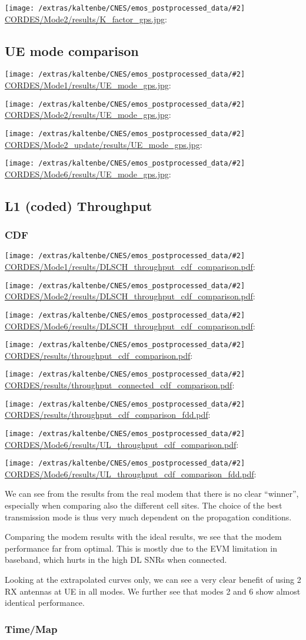\documentclass[a4paper,10pt]{article}
\newcommand{\printfile}[2][]{
 \begin{minipage}{8cm}
  \centering
  \texttt{[image: /extras/kaltenbe/CNES/emos\_postprocessed\_data/\#2]}
  \url{#2}: #1

 \end{minipage}
}
\begin{document}
\printfile{CORDES/Mode2/results/K_factor_gps.jpg}

\subsection{UE mode comparison}

\printfile{CORDES/Mode1/results/UE_mode_gps.jpg}
\printfile{CORDES/Mode2/results/UE_mode_gps.jpg}

\printfile{CORDES/Mode2_update/results/UE_mode_gps.jpg}
\printfile{CORDES/Mode6/results/UE_mode_gps.jpg}

\subsection{L1 (coded) Throughput}


\subsubsection{CDF}

\printfile{CORDES/Mode1/results/DLSCH_throughput_cdf_comparison.pdf}
\printfile{CORDES/Mode2/results/DLSCH_throughput_cdf_comparison.pdf}

\printfile{CORDES/Mode6/results/DLSCH_throughput_cdf_comparison.pdf}

\printfile{CORDES/results/throughput_cdf_comparison.pdf}
\printfile{CORDES/results/throughput_connected_cdf_comparison.pdf}

\printfile{CORDES/results/throughput_cdf_comparison_fdd.pdf}

\printfile{CORDES/Mode6/results/UL_throughput_cdf_comparison.pdf}
\printfile{CORDES/Mode6/results/UL_throughput_cdf_comparison_fdd.pdf}

We can see from the results from the real modem that there is no clear ``winner'', especially when comparing also the different cell sites. The choice of the best transmission mode is thus very much dependent on the propagation conditions. 

Comparing the modem results with the ideal results, we see that the modem performance far from optimal. This is mostly due to the EVM limitation in baseband, which hurts in the high DL SNRs when connected.

Looking at the extrapolated curves only, we can see a very clear benefit of using 2 RX antennas at UE in all modes. We further see that modes 2 and 6 show almost identical performance. 


\subsubsection{Time/Map}
\end{document}
